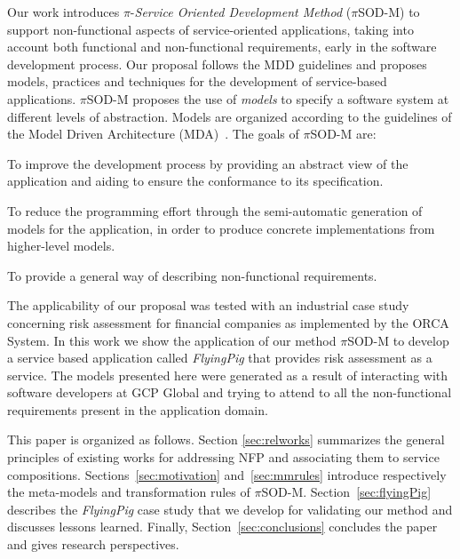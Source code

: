 \documentclass{singlecol-new}
\theoremstyle{TH}{
\newtheorem{lemma}{Lemma}
\newtheorem{theorem}[lemma]{Theorem}
\newtheorem{corrolary}[lemma]{Corrolary}
\newtheorem{conjecture}[lemma]{Conjecture}
\newtheorem{proposition}[lemma]{Proposition}
\newtheorem{claim}[lemma]{Claim}
\newtheorem{stheorem}[lemma]{Wrong Theorem}
\newtheorem{algorithm}{Algorithm}
}
\theoremstyle{THrm}{
\newtheorem{definition}{Definition}[section]
\newtheorem{question}{Question}[section]
\newtheorem{remark}{Remark}
\newtheorem{scheme}{Scheme}
}
\theoremstyle{THhit}{
\newtheorem{case}{Case}[section]
}
\theoremstyle{THhsl}{
\newtheorem{example}{Example}
}
\newcommand{\pisodm}[0]{$\pi$SOD-M\xspace}
\def\FlyingPig{\textsl{FlyingPig}\xspace}
\begin{document}
Our work introduces $\pi$-\textit{Service Oriented Development Method} (\pisodm) to support non-functional aspects of service-oriented applications, taking into account both functional and non-functional requirements, early in the software development process.
Our proposal follows the MDD guidelines and proposes models, practices and techniques for the development of service-based applications.  
\pisodm proposes  the use of \textit{models} to specify a software system at different levels of abstraction.
Models are organized according to the guidelines of the Model Driven Archi\-tec\-ture (MDA)~\cite{miller}.
The goals of  \pisodm are:

\begin{compactenum}[i]
\item To improve the development process by providing an abstract view of the application and aiding to ensure the conformance to its specification.
\item To reduce the programming effort through the semi-automatic generation of  models for the application, in order to produce concrete implementations from higher-level models.
\item To provide a general way of describing non-functional requirements.
\end{compactenum}

The applicability of our proposal was tested with an industrial case study concerning risk assessment for financial companies as implemented by the ORCA System\footnotemark {}. In this work we show the application of our method \pisodm to develop a service based application called \FlyingPig that provides risk assessment as a service.
The models presented here were generated as a result of interacting with software developers at GCP Global and trying to attend to all the non-functional requirements present in the application domain.

This paper is organized as follows.
Sec\-tion \ref{sec:relworks} summarizes the general principles of existing works for addressing NFP and associating them to service compositions.
Sections~\ref{sec:motivation} and~\ref{sec:mmrules} introduce respectively the meta-models and transformation rules of \pisodm.
Section~\ref{sec:flyingPig} describes the \FlyingPig case study that we develop for validating our method and discusses lessons learned.
Finally, Section~\ref{sec:conclusions} concludes the paper and gives research perspectives.
\end{document}
